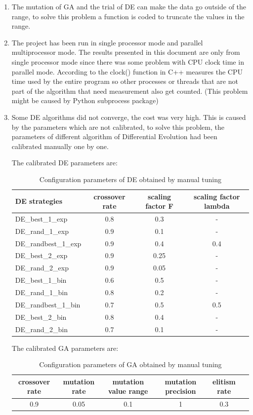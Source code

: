 \documentclass[12pt]{article}
\begin{document}
    \begin{enumerate}[label=\arabic*)]
	\item The mutation of GA and the trial of DE can make the data go outside of the range, to solve this problem a function is coded to truncate the values in the range.
	\item The project has been run in single processor mode and parallel multiprocessor mode. The results presented in this document are only from single processor mode since there was some problem with CPU clock time in parallel mode. According to \cite{clock} the clock() function in C++ measures the CPU time used by the entire program so other processes or threads that  are not part of the algorithm that need measurement also get counted. (This problem might be caused by Python subprocess package) 
	\item Some DE algorithms did not converge, the cost was very high. This is caused by the parameters which are not calibrated, to solve this problem, the parameters of different algorithm of Differential Evolution had been calibrated manually one by one.
	
	The calibrated DE parameters are:
\begin{table}[H]	
\centering
\small 
\begin{tabular}{lccc}

\hline
DE strategies & crossover rate& scaling factor F& scaling factor lambda\\
\hline 
DE\_best\_1\_exp & 0.8 &	0.3&	- \\
DE\_rand\_1\_exp& 0.9&	0.1&	- \\
DE\_randbest\_1\_exp& 0.9&	0.4&	0.4 \\
DE\_best\_2\_exp& 0.9&	0.25&	- \\
DE\_rand\_2\_exp& 0.9&	0.05&	- \\
DE\_best\_1\_bin& 0.6&	0.5&	- \\
DE\_rand\_1\_bin& 0.8&	0.2&	- \\
DE\_randbest\_1\_bin& 0.7&	0.5&	0.5\\
DE\_best\_2\_bin& 0.8&	0.4&	- \\
DE\_rand\_2\_bin& 0.7&	0.1&	- \\
\hline 
\end{tabular} 
\caption{Configuration parameters of DE obtained by manual tuning} 
\end{table}



The calibrated GA parameters are:
\begin{table}[H]	
\centering
\footnotesize
\begin{tabular}{cccccc}

\hline
crossover rate&	mutation rate&	mutation value range&	 mutation precision&	 elitism rate\\
\hline

0.9&	0.05&	0.1&	1&	0.3&\\

\hline 
\end{tabular} 

\caption{Configuration parameters of GA obtained by manual tuning} 
\end{table}

\end{enumerate}
\end{document}
